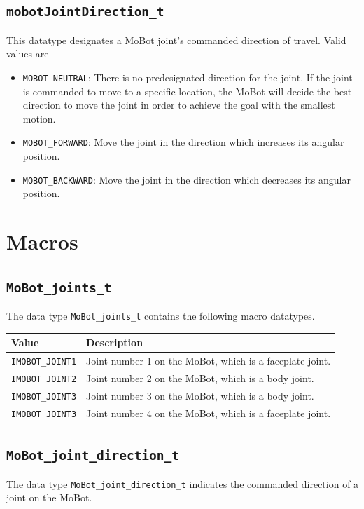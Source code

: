 \documentclass[11pt]{report}
\begin{document}
\subsection{\label{sec:mobotJointDirection_t}\texttt{mobotJointDirection\_t}}
This datatype designates a MoBot joint's commanded direction of travel. Valid values
are
\begin{itemize}
\item \texttt{MOBOT\_NEUTRAL}: There is no predesignated direction for the
joint. If the joint is commanded to move to a specific location, the MoBot will
decide the best direction to move the joint in order to achieve the goal with
the smallest motion.
\item \texttt{MOBOT\_FORWARD}: Move the joint in the direction which increases its 
angular position.
\item \texttt{MOBOT\_BACKWARD}: Move the joint in the direction which decreases
its angular position.
\end{itemize}

\section{Macros}

\subsection{\texttt{MoBot\_joints\_t}}
The data type \texttt{MoBot\_joints\_t} contains the following macro datatypes.\\

\begin{tabular}{p{3cm}p{7cm}} \hline 
Value & Description \\
\hline 
\texttt{IMOBOT\_JOINT1} & Joint number 1 on the MoBot, which is a faceplate joint. \\
\texttt{IMOBOT\_JOINT2} & Joint number 2 on the MoBot, which is a body joint. \\
\texttt{IMOBOT\_JOINT3} & Joint number 3 on the MoBot, which is a body joint. \\
\texttt{IMOBOT\_JOINT3} & Joint number 4 on the MoBot, which is a faceplate joint. 
\end{tabular}

\subsection{\texttt{MoBot\_joint\_direction\_t}}
The data type \texttt{MoBot\_joint\_direction\_t} indicates the commanded direction 
of a joint on the MoBot.
\end{document}
